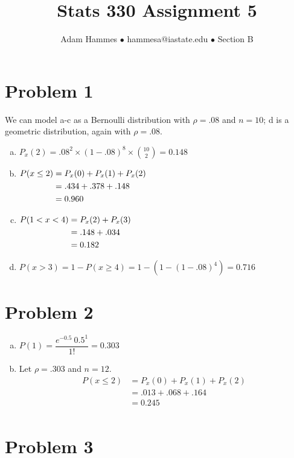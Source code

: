 \documentclass[11pt]{article}
\newenvironment{equ}{$\hfill\begin{aligned}[t]}{\end{aligned}\hfill \null$}
\begin{document}
\title{\vspace{-8ex}Stats 330 Assignment 5}
\author{Adam Hammes $\bullet$ hammesa@iastate.edu $\bullet$ Section B}
\maketitle

\section*{Problem 1}
We can model a-c as a Bernoulli distribution with $\rho = .08$ and $n=10$; d is a geometric distribution, again with $\rho = .08$.


\begin{enumerate}[(a)]	
	\item $P_x(2) = .08^2 \times (1-.08)^8 \times \binom{10}{2} = 0.148$
	\item
		\begin{equ}
			P(x \leq 2)&= P_x(0) + P_x(1) + P_x(2) \\
			&= .434 + .378 + .148 \\
			&=0 .960
		\end{equ}
	\item
		\begin{equ}
			P( 1 < x < 4) &= P_x(2) + P_x(3) \\
			&= .148 + .034 \\
			&= 0.182
		\end{equ}
	\item $P( x > 3 ) =1- P( x \geq 4) = 1-(1- (1-.08)^4) = 0.716$
\end{enumerate}

\section*{Problem 2}

\begin{enumerate}[(a)]
	\item $P(1) = \dfrac{e^{-0.5}\ 0.5 ^ 1}{1!} = 0.303$
	\item Let $\rho = .303$ and $n =12$.
		\begin{align*}
			P(x \leq 2) &= P_x(0) + P_x(1) + P_x(2) \\
			&= .013 + .068 + .164 \\
			&= 0.245 \\
		\end{align*}
\end{enumerate}

\section*{Problem 3}
\end{document}
